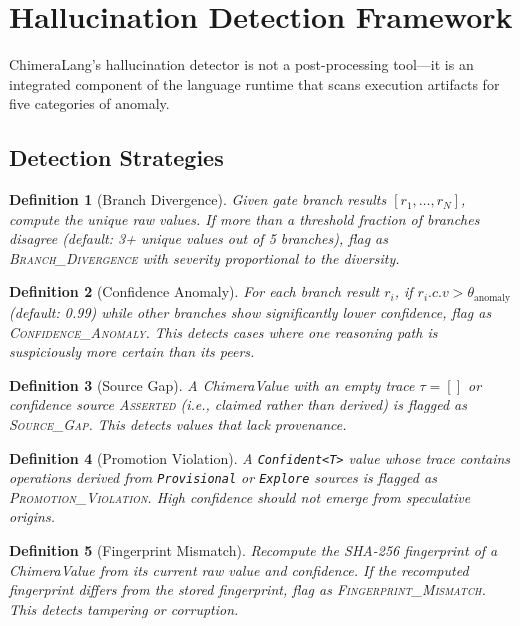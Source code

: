 \documentclass[11pt,a4paper]{article}
\newtheorem{definition}{Definition}[section]
\begin{document}
\section{Hallucination Detection Framework}
\label{sec:hallucination}

ChimeraLang's hallucination detector is not a post-processing tool---it is
an integrated component of the language runtime that scans execution artifacts
for five categories of anomaly.

\subsection{Detection Strategies}

\begin{definition}[Branch Divergence]
\label{def:divergence}
Given gate branch results $[r_1, \ldots, r_N]$, compute the unique raw values.
If more than a threshold fraction of branches disagree (default: 3+ unique values
out of 5 branches), flag as \textsc{Branch\_Divergence} with severity
proportional to the diversity.
\end{definition}

\begin{definition}[Confidence Anomaly]
\label{def:confanomaly}
For each branch result $r_i$, if $r_i.c.v > \theta_{\text{anomaly}}$
(default: 0.99) while other branches show significantly lower confidence,
flag as \textsc{Confidence\_Anomaly}. This detects cases where one reasoning
path is suspiciously more certain than its peers.
\end{definition}

\begin{definition}[Source Gap]
\label{def:sourcegap}
A ChimeraValue with an empty trace $\tau = []$ or confidence source
\textsc{Asserted} (i.e., claimed rather than derived) is flagged as
\textsc{Source\_Gap}. This detects values that lack provenance.
\end{definition}

\begin{definition}[Promotion Violation]
\label{def:promotion}
A \texttt{Confident<T>} value whose trace contains operations derived from
\texttt{Provisional} or \texttt{Explore} sources is flagged as
\textsc{Promotion\_Violation}. High confidence should not emerge from
speculative origins.
\end{definition}

\begin{definition}[Fingerprint Mismatch]
\label{def:fingerprint}
Recompute the SHA-256 fingerprint of a ChimeraValue from its current raw
value and confidence. If the recomputed fingerprint differs from the stored
fingerprint, flag as \textsc{Fingerprint\_Mismatch}. This detects
tampering or corruption.
\end{definition}
\end{document}
